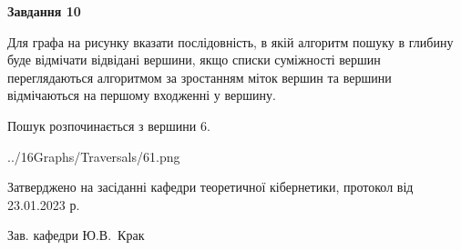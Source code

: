 \documentclass[12pt, ukrainian]{article}
\begin{document}
{\begin {large}
{\begin {center}\textbf{Завдання 10}\end {center}}\par
Для графа на рисунку вказати послідовність, в якій алгоритм пошуку в глибину буде відмічати відвідані вершини, якщо списки суміжності вершин переглядаються алгоритмом за зростанням міток вершин та вершини відмічаються на першому вход\-женні у вершину.\par
Пошук розпочинається з вершини 6.\par

\begin{center}
	{../16Graphs/Traversals/61.png}
\end{center}\par
\newpage


\end {large}
}
{\smallskip \begin {small} Затверджено на засіданні кафедри теоретичної кібернетики, протокол  від   23.01.2023 р.\par\smallskip\smallskip
{\parbox {6.5 cm}{Зав. кафедри \dotfill Ю.В.~Крак}} \end{small}}
\end{document}
